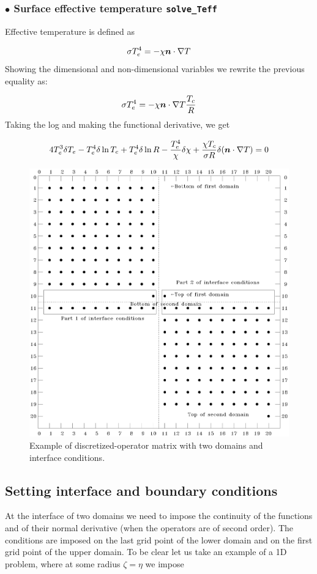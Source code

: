 \subsubsection{$\bullet$ \bf Surface effective temperature {\tt solve\_Teff}}

Effective temperature is defined as

\[ \sigma T_e^4 = -\khi\vn\cdot\na T\]
Showing the dimensional and non-dimensional variables we rewrite the previous equality as:

\[ \sigma T_e^4 = -\khi\vn\cdot\na T \frac{T_c}{R}\]
Taking the log and making the functional derivative, we get

\begin{equation}
4T_e^3\delta T_e -T_e^4\delta\ln T_c + T_e^4\delta\ln R -\frac{T_e^4}{\khi}\delta\khi + \frac{\khi T_c}{\sigma
R}\delta(\vn\cdot\nabla T) = 0
\end{equation}

\begin{figure}[t]
\centering
\includegraphics[width=0.8\linewidth]{fig/matrix_pedago.eps}
\caption{Example of discretized-operator matrix with two domains and
interface conditions.}
\label{matp}
\end{figure}

\subsection{Setting interface and boundary conditions}

At the interface of two domains we need to impose the continuity of the
functions and of their normal derivative (when the operators are of
second order). The conditions are imposed on the last grid point of the
lower domain and on the first grid point of the upper domain. To be
clear let us take an example of a 1D problem, where at some radius
$\zeta=\eta$ we impose

